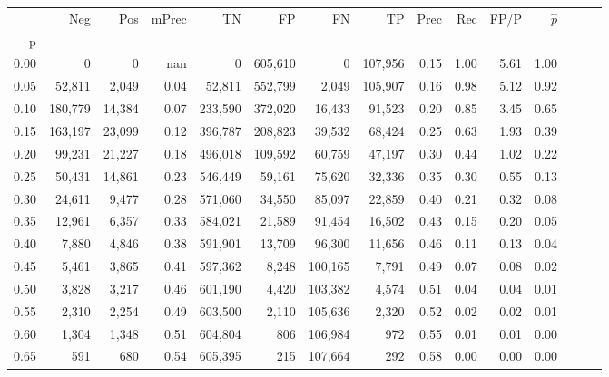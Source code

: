 \begin{tabular}{rrrrrrrrrrrrrrr}
\toprule
{} &      Neg &     Pos & mPrec &       TN &       FP &       FN &       TP &  Prec &   Rec &  FP/P & $\hat{p}$ \\
p    &          &         &       &          &          &          &          &       &       &       &           \\
\midrule
0.00 &        0 &       0 &   nan &        0 &  605,610 &        0 &  107,956 &  0.15 &  1.00 &  5.61 &      1.00 \\
0.05 &   52,811 &   2,049 &  0.04 &   52,811 &  552,799 &    2,049 &  105,907 &  0.16 &  0.98 &  5.12 &      0.92 \\
0.10 &  180,779 &  14,384 &  0.07 &  233,590 &  372,020 &   16,433 &   91,523 &  0.20 &  0.85 &  3.45 &      0.65 \\
0.15 &  163,197 &  23,099 &  0.12 &  396,787 &  208,823 &   39,532 &   68,424 &  0.25 &  0.63 &  1.93 &      0.39 \\
0.20 &   99,231 &  21,227 &  0.18 &  496,018 &  109,592 &   60,759 &   47,197 &  0.30 &  0.44 &  1.02 &      0.22 \\
0.25 &   50,431 &  14,861 &  0.23 &  546,449 &   59,161 &   75,620 &   32,336 &  0.35 &  0.30 &  0.55 &      0.13 \\
0.30 &   24,611 &   9,477 &  0.28 &  571,060 &   34,550 &   85,097 &   22,859 &  0.40 &  0.21 &  0.32 &      0.08 \\
0.35 &   12,961 &   6,357 &  0.33 &  584,021 &   21,589 &   91,454 &   16,502 &  0.43 &  0.15 &  0.20 &      0.05 \\
0.40 &    7,880 &   4,846 &  0.38 &  591,901 &   13,709 &   96,300 &   11,656 &  0.46 &  0.11 &  0.13 &      0.04 \\
0.45 &    5,461 &   3,865 &  0.41 &  597,362 &    8,248 &  100,165 &    7,791 &  0.49 &  0.07 &  0.08 &      0.02 \\
0.50 &    3,828 &   3,217 &  0.46 &  601,190 &    4,420 &  103,382 &    4,574 &  0.51 &  0.04 &  0.04 &      0.01 \\
0.55 &    2,310 &   2,254 &  0.49 &  603,500 &    2,110 &  105,636 &    2,320 &  0.52 &  0.02 &  0.02 &      0.01 \\
0.60 &    1,304 &   1,348 &  0.51 &  604,804 &      806 &  106,984 &      972 &  0.55 &  0.01 &  0.01 &      0.00 \\
0.65 &      591 &     680 &  0.54 &  605,395 &      215 &  107,664 &      292 &  0.58 &  0.00 &  0.00 &      0.00 \\

\end{tabular}
